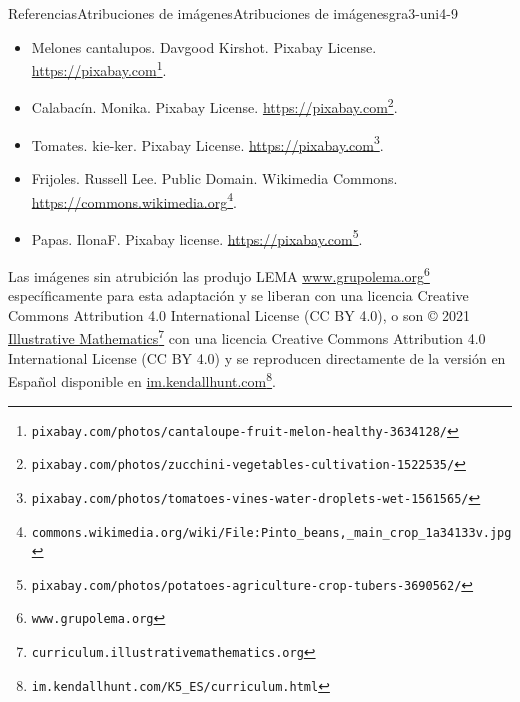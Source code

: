 \documentclass[twoside,10pt,]{article}
\begin{document}
\begin{references-section}{Referencias}{Atribuciones de imágenes}{}{Atribuciones de imágenes}{}{}{gra3-uni4-9}
\begin{itemize}[label=\textbullet]
\begin{itemize}[label=$\circ$]
\item{}Melones cantalupos. Davgood Kirshot. Pixabay License. \href{https://pixabay.com/photos/cantaloupe-fruit-melon-healthy-3634128/}{https:\slash{}\slash{}pixabay.com}\footnote{\nolinkurl{pixabay.com/photos/cantaloupe-fruit-melon-healthy-3634128/}\label{gra3-uni4-9-2-9-2-2-1-2}}.%
\item{}Calabacín. Monika. Pixabay License. \href{https://pixabay.com/photos/zucchini-vegetables-cultivation-1522535/}{https:\slash{}\slash{}pixabay.com}\footnote{\nolinkurl{pixabay.com/photos/zucchini-vegetables-cultivation-1522535/}\label{gra3-uni4-9-2-9-2-3-1-2}}.%
\item{}Tomates. kie-ker. Pixabay License. \href{https://pixabay.com/photos/tomatoes-vines-water-droplets-wet-1561565/}{https:\slash{}\slash{}pixabay.com}\footnote{\nolinkurl{pixabay.com/photos/tomatoes-vines-water-droplets-wet-1561565/}\label{gra3-uni4-9-2-9-2-4-1-2}}.%
\item{}Frijoles. Russell Lee. Public Domain. Wikimedia Commons. \href{https://commons.wikimedia.org/wiki/File:Pinto_beans,_main_crop_1a34133v.jpg}{https:\slash{}\slash{}commons.wikimedia.org}\footnote{\nolinkurl{commons.wikimedia.org/wiki/File:Pinto_beans,_main_crop_1a34133v.jpg}\label{gra3-uni4-9-2-9-2-5-1-2}}.%
\item{}Papas. IlonaF. Pixabay license. \href{https://pixabay.com/photos/potatoes-agriculture-crop-tubers-3690562/}{https:\slash{}\slash{}pixabay.com}\footnote{\nolinkurl{pixabay.com/photos/potatoes-agriculture-crop-tubers-3690562/}\label{gra3-uni4-9-2-9-2-6-1-2}}.%
\end{itemize}
\end{itemize}
Las imágenes sin atrubición las produjo LEMA \href{https://www.grupolema.org}{www.grupolema.org}\footnote{\nolinkurl{www.grupolema.org}\label{gra3-uni4-9-3-2}} específicamente para esta adaptación y se liberan con una licencia Creative Commons Attribution 4.0 International License (CC BY 4.0), o son © 2021 \href{https://curriculum.illustrativemathematics.org}{Illustrative Mathematics}\footnote{\nolinkurl{curriculum.illustrativemathematics.org}\label{gra3-uni4-9-3-4}} con una licencia Creative Commons Attribution 4.0 International License (CC BY 4.0) y se reproducen directamente de la versión en Español disponible en \href{https://im.kendallhunt.com/K5_ES/curriculum.html}{im.kendallhunt.com}\footnote{\nolinkurl{im.kendallhunt.com/K5_ES/curriculum.html}\label{gra3-uni4-9-3-6}}.%
\end{references-section}
\end{document}
